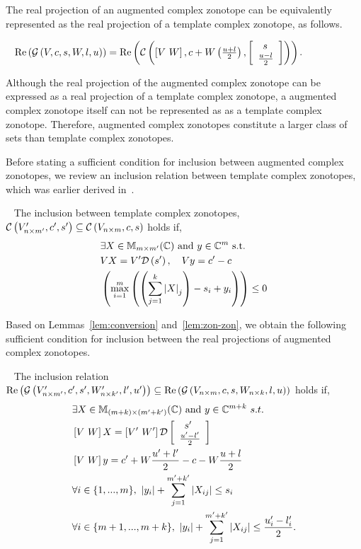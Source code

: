


The real projection of an augmented complex zonotope can be
equivalently represented as the real projection of a template complex
zonotope, as follows.  
\begin{lemma}~\label{lem:conversion}
$\real\lt(\gcz{V}{c}{s}{W}{l}{u}\rt) = \real\lt(\cz{\lt[V~W\rt]}{c+W\lt(\frac{u+l}{2}\rt)}{\ColumnJoin{\hspace{0.5em}s}{\frac{u-l}{2}}}\rt)$.
\end{lemma}
Although the real projection of the augmented complex zonotope can
be expressed as a real projection of a template complex zonotope, a
augmented complex zonotope itself can not be represented as as a
template complex zonotope.  Therefore, augmented complex zonotopes
constitute a larger class of sets than template complex zonotopes.

Before stating a sufficient condition for inclusion between augmented complex
zonotopes, we review an inclusion relation between template complex
zonotopes, which was earlier derived in~\cite{todo}.
\begin{lemma}~\label{lem:zon-zon} The inclusion between template complex zonotopes,
  $\cz{V^\pr_{n\times m^\pr}}{c^\pr}{s^\pr}\subseteq \cz{V_{n\times m}}{c}{s}$ holds if,
\begin{align}
\begin{split}
& \exists X\in\mat{m}{m^\pr}{\mb{C}}~\text{and}~y\in\mb{C}^{m}~\text{s.t.}\\
& \transfer{V}{V^\pr}{s^\pr}{X},~~~\centertransfer{V}{c}{c^\pr}{y}\\
& \lt(\scalebound{X}{y}{s}{m}{k}\rt)\leq 0\\
\end{split}
\end{align}
\end{lemma}

Based on Lemmas~\ref{lem:conversion} and~\ref{lem:zon-zon}, we obtain
the following sufficient condition for inclusion between the real
projections of augmented complex zonotopes.
\begin{lemma}~\label{lem:gcz-gcz}
The inclusion relation
$\real\lt(\gcz{V^\pr_{n\times m^\pr}}{c^\pr}{s^\pr}{W^\pr_{n\times k^\pr}}{l^\pr}{u^\pr}\rt)\subseteq
\real\lt(\gcz{V_{n\times m}}{c}{s}{W_{n\times k}}{l}{u}\rt)$ holds if,
\begin{align}
\begin{split}
& \exists X\in\mat{(m+k)}{(m^\pr+k^\pr)}{\mb{C}}~\text{and}~y\in\mb{C}^{m+k}~s.t.\\
& \lt[V~W\rt]X = \lt[V^\pr~W^\pr\rt]\dg\ColumnJoin{\hspace{0.5em}s^\pr}{\frac{u^\pr-l^\pr}{2}}\\
& \lt[V~W\rt]y = c^\pr+W\frac{u^\pr+l^\pr}{2}-c-W\frac{u+l}{2}\\
& \forall i\in\tup{m},~|y_i|+\sum_{j=1}^{m^\pr+k^\pr}\lt|X_{ij}\rt|\leq s_i\\
& \forall i\in\{m+1,...,m+k\},~|y_i|+\sum_{j=1}^{m^\pr+k^\pr}\lt|X_{ij}\rt|\leq \frac{u^\pr_i-l^\pr_i}{2}.
\end{split}
\end{align}
\end{lemma}

